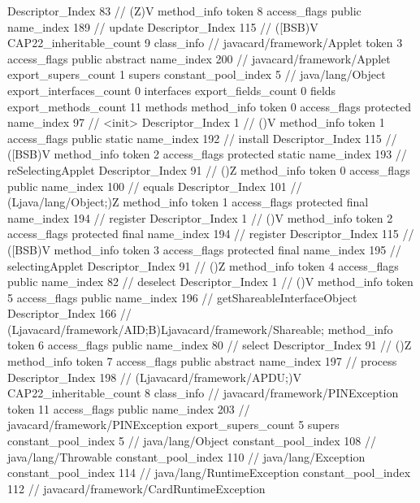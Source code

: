 {{{{{					Descriptor_Index	83		// (Z)V
				}
				method_info {
					token	8
					access_flags	public
					name_index	189		// update
					Descriptor_Index	115		// ([BSB)V
				}
			}
			CAP22_inheritable_count	9
		}
		class_info {		// javacard/framework/Applet
			token	3
			access_flags	public abstract
			name_index	200		// javacard/framework/Applet
			export_supers_count	1
			supers {
				constant_pool_index	5		// java/lang/Object
			}
			export_interfaces_count	0
			interfaces {
			}
			export_fields_count	0
			fields {
			}
			export_methods_count	11
			methods {
				method_info {
					token	0
					access_flags	protected
					name_index	97		// <init>
					Descriptor_Index	1		// ()V
				}
				method_info {
					token	1
					access_flags	public static
					name_index	192		// install
					Descriptor_Index	115		// ([BSB)V
				}
				method_info {
					token	2
					access_flags	protected static
					name_index	193		// reSelectingApplet
					Descriptor_Index	91		// ()Z
				}
				method_info {
					token	0
					access_flags	public
					name_index	100		// equals
					Descriptor_Index	101		// (Ljava/lang/Object;)Z
				}
				method_info {
					token	1
					access_flags	protected final
					name_index	194		// register
					Descriptor_Index	1		// ()V
				}
				method_info {
					token	2
					access_flags	protected final
					name_index	194		// register
					Descriptor_Index	115		// ([BSB)V
				}
				method_info {
					token	3
					access_flags	protected final
					name_index	195		// selectingApplet
					Descriptor_Index	91		// ()Z
				}
				method_info {
					token	4
					access_flags	public
					name_index	82		// deselect
					Descriptor_Index	1		// ()V
				}
				method_info {
					token	5
					access_flags	public
					name_index	196		// getShareableInterfaceObject
					Descriptor_Index	166		// (Ljavacard/framework/AID;B)Ljavacard/framework/Shareable;
				}
				method_info {
					token	6
					access_flags	public
					name_index	80		// select
					Descriptor_Index	91		// ()Z
				}
				method_info {
					token	7
					access_flags	public abstract
					name_index	197		// process
					Descriptor_Index	198		// (Ljavacard/framework/APDU;)V
				}
			}
			CAP22_inheritable_count	8
		}
		class_info {		// javacard/framework/PINException
			token	11
			access_flags	public
			name_index	203		// javacard/framework/PINException
			export_supers_count	5
			supers {
				constant_pool_index	5		// java/lang/Object
				constant_pool_index	108		// java/lang/Throwable
				constant_pool_index	110		// java/lang/Exception
				constant_pool_index	114		// java/lang/RuntimeException
				constant_pool_index	112		// javacard/framework/CardRuntimeException
}}}}
